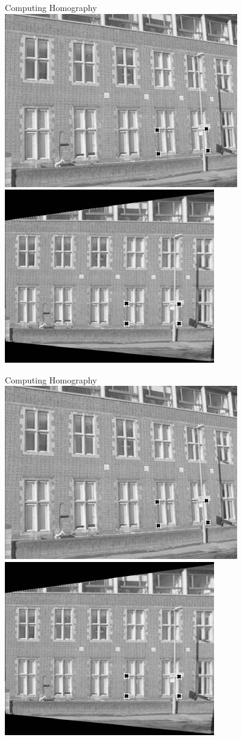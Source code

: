 \documentclass[times,t]{beamer}
\begin{document}
\begin{frame}{Computing Homography}
  \includegraphics[width=0.45\linewidth]{media/removing-perspective-distortion.png}
  \includegraphics[width=0.45\linewidth]{media/removing-perspective-distortion-b.png}
\end{frame}


\begin{frame}{Computing Homography}
  \includegraphics[width=0.45\linewidth]{media/removing-perspective-distortion.png}
  \includegraphics[width=0.45\linewidth]{media/removing-perspective-distortion-b.png}
\end{frame}
\end{document}
